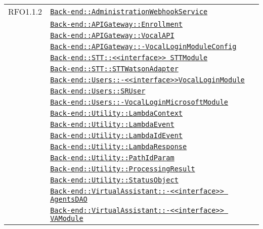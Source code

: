 \begin{longtable}{|>{\centering}m{3cm}|m{10cm}<{\centering}|}
RFO1.1.2 & \hyperref[Back-end::AdministrationWebhookService]{\texttt{Back-end::AdministrationWebhookService}}\\
& \hyperref[Back-end::APIGateway::Enrollment]{\texttt{Back-end::APIGateway::Enrollment}}\\
& \hyperref[Back-end::APIGateway::VocalAPI]{\texttt{Back-end::APIGateway::VocalAPI}}\\
& \hyperref[Back-end::APIGateway::VocalLoginModuleConfig]{\texttt{Back-end::APIGateway::-\linebreak VocalLoginModuleConfig}}\\
& \hyperref[Back-end::STT::<<interface>> STTModule]{\texttt{Back-end::STT::<<interface>> STTModule}}\\
& \hyperref[Back-end::STT::STTWatsonAdapter]{\texttt{Back-end::STT::STTWatsonAdapter}}\\
& \hyperref[Back-end::Users::<<interface>>VocalLoginModule]{\texttt{Back-end::Users::-\linebreak <<interface>>VocalLoginModule}}\\
& \hyperref[Back-end::Users::SRUser]{\texttt{Back-end::Users::SRUser}}\\
& \hyperref[Back-end::Users::VocalLoginMicrosoftModule]{\texttt{Back-end::Users::-\linebreak VocalLoginMicrosoftModule}}\\
& \hyperref[Back-end::Utility::LambdaContext]{\texttt{Back-end::Utility::LambdaContext}}\\
& \hyperref[Back-end::Utility::LambdaEvent]{\texttt{Back-end::Utility::LambdaEvent}}\\
& \hyperref[Back-end::Utility::LambdaIdEvent]{\texttt{Back-end::Utility::LambdaIdEvent}}\\
& \hyperref[Back-end::Utility::LambdaResponse]{\texttt{Back-end::Utility::LambdaResponse}}\\
& \hyperref[Back-end::Utility::PathIdParam]{\texttt{Back-end::Utility::PathIdParam}}\\
& \hyperref[Back-end::Utility::ProcessingResult]{\texttt{Back-end::Utility::ProcessingResult}}\\
& \hyperref[Back-end::Utility::StatusObject]{\texttt{Back-end::Utility::StatusObject}}\\
& \hyperref[Back-end::VirtualAssistant::<<interface>> AgentsDAO]{\texttt{Back-end::VirtualAssistant::-\linebreak <<interface>> AgentsDAO}}\\
& \hyperref[Back-end::VirtualAssistant::<<interface>> VAModule]{\texttt{Back-end::VirtualAssistant::-\linebreak <<interface>> VAModule}}\\

\end{longtable}
